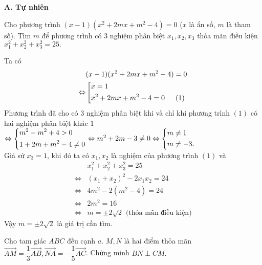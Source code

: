 \noindent\textbf{A. Tự nhiên}
\begin{bt}%
	Cho phương trình $ (x-1)(x^2 +2mx+m^2 -4)=0 $ ($ x $ là ẩn số, $ m $ là tham số). Tìm $ m $ để phương trình có $ 3 $ nghiệm phân biệt $ x_1, x_2,x_3 $ thỏa mãn điều kiện $ x_1^2+x_2^2+x_3^2 =25.$
	\loigiai{ 
	}
\end{bt}
Ta có \begin{align*}
&(x-1)(x^2 +2mx+m^2 -4)=0\\
\Leftrightarrow&\left[\begin{aligned}&x=1\\&x^2 +2mx+m^2-4=0 \,~~~~ (1)\end{aligned}\right.
\end{align*}
Phương trình đã cho có $ 3 $ nghiệm phân biệt khi và chỉ khi phương trình $ (1) $ có hai nghiệm phân biệt khác $ 1 $\\
$ \Leftrightarrow \left\{\begin{aligned}&m^2-m^2+4>0\\&1+2m+m^2-4\ne 0\end{aligned}\right.\Leftrightarrow m^2+2m-3\ne 0\Leftrightarrow \left\{\begin{aligned}& m\ne1\\&m\ne -3.\end{aligned}\right. $\\
Giả sử $ x_3=1 $, khi đó ta có $ x_1,x_2 $ là nghiệm của phương trình $ (1) $ và 
\begin{align*}
&x_1^2+x_2^2+x_3^2=25\\
\Leftrightarrow & (x_1+x_2)^2 -2x_1x_2 =24\\
\Leftrightarrow & 4m^2-2(m^2-4)=24\\
\Leftrightarrow & 2m^2=16\\
 \Leftrightarrow &m=\pm 2\sqrt{2} \text{ (thỏa mãn điều kiện)}
\end{align*}
Vậy $ m=\pm 2\sqrt{2} $ là giá trị cần tìm.
\begin{bt}%
	Cho tam giác $ ABC $ đều cạnh $ a $. $ M,N $ là hai điểm thỏa mãn $ \vec{AM} =\dfrac{1}{3}\vec{AB}, \vec{NA}=-\dfrac{1}{5}\vec{AC} $. Chứng minh $ BN\perp CM.$
\end{bt}



